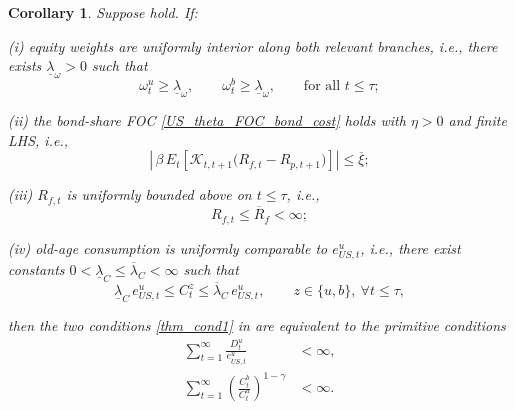 \documentclass[12pt]{article}
\theoremstyle{plain}
\newtheorem{coro}{Corollary}
\begin{document}
\begin{coro}\label{coro1}
Suppose  hold. If:

(i) equity weights are uniformly interior along both relevant branches, i.e., there exists
$\underline{\lambda}_\omega>0$ such that
\[
\omega_t^u\ge \underline{\lambda}_\omega,
\qquad
\omega_t^b\ge \underline{\lambda}_\omega,
\qquad\text{for all }t\le\tau;
\]

(ii) the bond-share FOC \eqref{US_theta_FOC_bond_cost} holds with $\eta>0$ and finite LHS, i.e.,
\[
\left|\,\beta\,E_t\!\left[\mathcal K_{t,t+1}\bigl(R_{f,t}-R_{p,t+1}\bigr)\right]\right|
\le \overline\xi;
\]

(iii) $R_{f,t}$ is uniformly bounded above on $t\le\tau$, i.e.,
\[
R_{f,t}\le \overline R_f<\infty;
\]

(iv) old-age consumption is uniformly comparable to $e_{US,t}^u$, i.e., there exist constants
$0<\underline{\lambda}_C\le \overline{\lambda}_C<\infty$ such that
\[
\underline{\lambda}_C\,e_{US,t}^u
\le
C_t^z
\le
\overline{\lambda}_C\,e_{US,t}^u,
\qquad
z\in\{u,b\},\ \forall t\le\tau,
\]

then the two conditions \eqref{thm_cond1} in  are equivalent to the primitive conditions
\begin{subequations}\label{thm_cond2}
\begin{align}
\sum_{t=1}^\infty \frac{D_t^u}{e_{US,t}^u}&<\infty, \label{thm_cond_2a}\\
\sum_{t=1}^\infty
\left(\frac{C_t^b}{C_t^u}\right)^{1-\gamma}&<\infty. \label{thm_cond_2b}
\end{align}
\end{subequations}
\end{coro}
\end{document}
